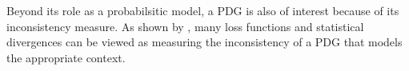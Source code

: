 \documentclass[twoside]{article}
\begin{document}
Beyond its role as a probabilsitic model,
a PDG is also of interest because of its inconsistency measure.
As shown by \textcite{one-true-loss},
    many loss functions and statistical divergences
    can be viewed as measuring the inconsistency
    of a PDG that models the appropriate context.
\end{document}

